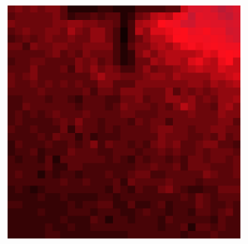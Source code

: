 \documentclass[10pt]{scrartcl}
\begin{document}
\begin{figure}[!ht]
\begin{subfigure}[b]{.3\linewidth}
    \end{subfigure}
    \begin{subfigure}[b]{.3\linewidth}
        \centering
        \includegraphics[width=1.2\linewidth]{../plots_tables_images/1d1dcrop_1_0.eps}
    \end{subfigure}



\end{figure}
\end{document}
